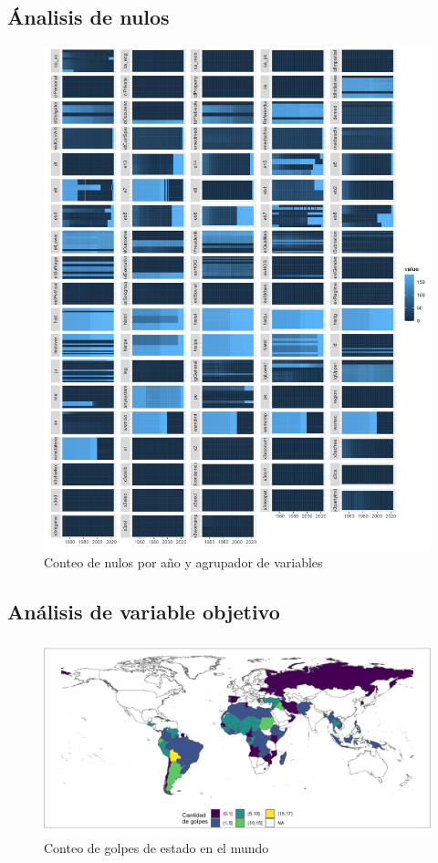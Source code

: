 \documentclass{article}
\begin{document}
\subsection{Ánalisis de nulos}
\begin{figure}[H]
  \centering  
  \includegraphics[width=1\textwidth]{1_nas.png}
  \caption{Conteo de nulos por año y agrupador de variables}
\end{figure}

\subsection{Análisis de variable objetivo}

\begin{figure}[H]
  \centering  
  \includegraphics[width=1\textwidth]{2_golpes.png}
  \caption{Conteo de golpes de estado en el mundo}
\end{figure}
\end{document}
